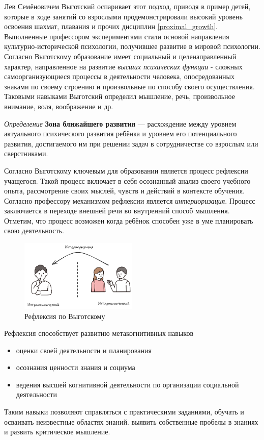 Лев Семёновичем Выготский оспаривает этот подход, приводя в пример детей, которые в ходе занятий со взрослыми продемонстрировали
высокий уровень освоения шахмат, плавания и прочих дисциплин \ref{proximal_growth}. Выполненные профессором
экспериментами стали основой направления культурно-исторической психологии, получившее развитие в мировой психологии.
Согласно Выготскому образование имеет социальный и целенаправленный характер, направленное на развитие 
\textit{высших психических функции} - сложных самоорганизующиеся процессы в деятельности человека, 
опосредованных знаками по своему строению и произвольные по способу своего осуществления. Таковыми навыками Выготский
определил мышление, речь, произвольное внимание, воля, воображение и др.


\textit{Определение} \textbf{Зона ближайшего развития} —  расхождение между уровнем актуального психического развития ребёнка
 и уровнем его потенциального развития, достигаемого им при решении задач в сотрудничестве со взрослым или сверстниками. 


Согласно Выготскому ключевым для образовании является процесс рефлексии учащегося.
Такой процесс включает в себя осознанный анализ своего учебного опыта, 
рассмотрение своих мыслей, чувств и действий в контексте обучения. Согласно профессору
механизмом рефлексии является \textit{интериоризация}. Процесс заключается в переходе внешней речи 
во внутренний способ мышления. Отметим, что процесс возможен когда ребёнок способен уже в уме
планировать свою деятельность. 
 
\begin{figure}[h]
    \centering
    \includegraphics[width=0.5\textwidth]{assets/pedagogic/psy/reflection.excalidraw.png}
    \caption{Рефлексия по Выготскому \cite{выготский2014мышление}}
    \label{reflection}
\end{figure}
 
 Рефлексия способствует развитию метакогнитивных навыков \begin{itemize}
     \item оценки своей деятельности и планирования
     \item осознания ценности знания и социума
     \item ведения высшей когнитивной деятельности по организации социальной деятельности
 \end{itemize}
Таким навыки позволяют справляться с практическими заданиями, обучать и осваивать неизвестные областях знаний.
выявить собственные пробелы в знаниях и развить критическое мышление.


